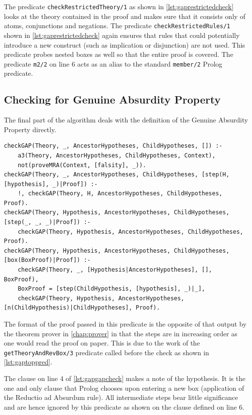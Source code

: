 \documentclass[11pt,twoside,a4paper]{report}
\begin{document}
The predicate \lstinline$checkRestrictedTheory/1$ as shown in \autoref{lst:gaprestrictedcheck} looks at the theory contained in the proof and makes sure that it consists only of atoms, conjunctions and negations. The predicate \lstinline$checkRestrictedRules/1$ shown in \autoref{lst:gaprestrictedcheck} again ensures that rules that could potentially introduce a new construct (such as implication or disjunction) are not used. This predicate probes nested boxes as well so that the entire proof is covered. The predicate \lstinline$m2/2$ on line 6 acts as an alias to the standard \lstinline$member/2$ Prolog predicate.

\subsection{Checking for Genuine Absurdity Property}
The final part of the algorithm deals with the definition of the Genuine Absurdity Property directly.

\begin{lstlisting}[caption={Checking whether a proof follows the Genuine Absurdity Property},label=lst:gapgapcheck]
checkGAP(Theory, _, AncestorHypotheses, ChildHypotheses, []) :-
	a3(Theory, AncestorHypotheses, ChildHypotheses, Context),
	not(proveMRA(Context, [falsity], _)).
checkGAP(Theory, _, AncestorHypotheses, ChildHypotheses, [step(H, [hypothesis], _)|Proof]) :-
	!, checkGAP(Theory, H, AncestorHypotheses, ChildHypotheses, Proof).
checkGAP(Theory, Hypothesis, AncestorHypotheses, ChildHypotheses, [step(_, _, _)|Proof]) :-
	checkGAP(Theory, Hypothesis, AncestorHypotheses, ChildHypotheses, Proof).
checkGAP(Theory, Hypothesis, AncestorHypotheses, ChildHypotheses, [box(BoxProof)|Proof]) :-
	checkGAP(Theory, _, [Hypothesis|AncestorHypotheses], [], BoxProof),
	BoxProof = [step(ChildHypothesis, [hypothesis], _)|_],
	checkGAP(Theory, Hypothesis, AncestorHypotheses, [n(ChildHypothesis)|ChildHypotheses], Proof).
\end{lstlisting}

The format of the proof passed in this predicate is the opposite of that output by the theorem prover in \autoref{chap:prover} in that the steps are in increasing order as one would read the proof on paper. This is due to the work of the \lstinline$getTheoryAndRevBox/3$ predicate called before the check as shown in \autoref{lst:gaptoppred}.

The clause on line 4 of \autoref{lst:gapgapcheck} makes a note of the hypothesis. It is the one and only clause that Prolog chooses upon entering a new box (application of the Reductio ad Absurdum rule). All intermediate steps bear little significance and are hence ignored by this predicate as shown on the clause defined on line 6. 
\end{document}
